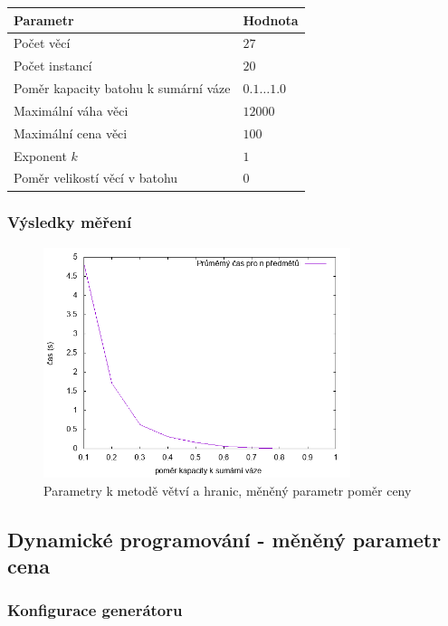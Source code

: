 \documentclass{article}
\begin{document}
\begin{table}[H]
\centering
    \begin{tabular}{ |l|l| } 
        \hline
        Parametr & Hodnota \\
        \hline
        \hline
        Počet věcí & $27$ \\
        Počet instancí & $20$ \\
        Poměr kapacity batohu k sumární váze & $0.1 \dots 1.0$ \\
        Maximální váha věci & $12000$ \\
        Maximální cena věci & $100$ \\
        Exponent $k$ & $1$ \\
        Poměr velikostí věcí v batohu & $0$ \\
        \hline
    \end{tabular}
\end{table}

\subsubsection*{Výsledky měření}

\begin{figure}[H]
    \centering
    \includegraphics[width=0.8\textwidth]{inputs-bb-ratio/inputs-bb-ratio.png}
    \caption{Parametry k metodě větví a hranic, měněný parametr poměr ceny}
    \label{fig:g2}
\end{figure}

\subsection{Dynamické programování - měněný parametr cena}

\subsubsection*{Konfigurace generátoru}
\end{document}
